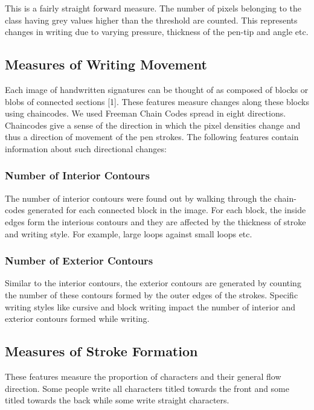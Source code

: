 \documentclass{article}
\begin{document}
This is a fairly straight forward measure. The number of pixels belonging to the class having grey values higher than the threshold are counted. This represents changes in writing due to varying pressure, thickness of the pen-tip and angle etc.

\subsection{Measures of Writing Movement}

Each image of handwritten signatures can be thought of as composed of blocks or blobs of connected sections [1]. These features measure changes along these blocks using chaincodes. We used Freeman Chain Codes spread in eight directions. Chaincodes give a sense of the direction in which the pixel densities change and thus a direction of movement of the pen strokes. The following features contain information about such directional changes:

\subsubsection{Number of Interior Contours}

The number of interior contours were found out by walking through the chain-codes generated for each connected block in the image. For each block, the inside edges form the interious contours and they are affected by the thickness of stroke and writing style. For example, large loops against small loops etc.

\subsubsection{Number of Exterior Contours}

Similar to the interior contours, the exterior contours are generated by counting the number of these contours formed by the outer edges of the strokes. Specific writing styles like cursive and block writing impact the number of interior and exterior contours formed while writing.

\subsection{Measures of Stroke Formation}

These features measure the proportion of characters and their general flow direction. Some people write all characters titled towards the front and some titled towards the back while some write straight characters.
\end{document}
